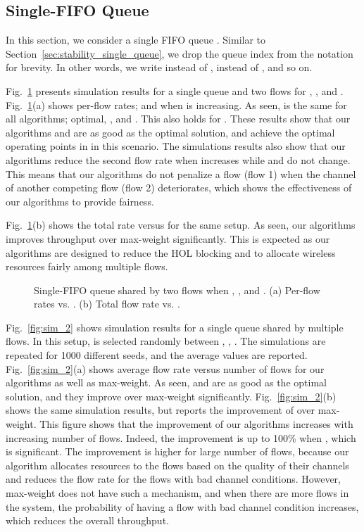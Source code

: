 \documentclass[conference]{IEEEtran}
\begin{document}
\subsection{Single-FIFO Queue}
In this section, we consider  a single FIFO queue . Similar to Section~{\ref{sec:stability_single_queue}}, we drop the queue index  from the notation for brevity. In other words, we write  instead of ,  instead of , and so on. 

Fig.~\ref{fig:sim_1} presents simulation results for a single queue and two flows for , , and . Fig.~\ref{fig:sim_1}(a) shows per-flow rates;  and  when  is increasing. As seen,  is the same for all algorithms; optimal, , and . This also holds for . These results show that our algorithms  and  are as good as the optimal solution, and achieve the optimal operating points in  in this scenario. The simulations results also show that our algorithms reduce the second flow rate  when  increases while  and  do not change. This means that our algorithms do not penalize a flow (flow 1) when the channel of another competing flow (flow 2) deteriorates, which shows the effectiveness of our algorithms to provide fairness. 

Fig.~\ref{fig:sim_1}(b) shows the total rate  versus  for the same setup. As seen, our algorithms improves throughput over max-weight significantly. This is expected as our algorithms are designed to reduce the HOL blocking and to allocate wireless resources fairly among multiple flows. 
\begin{figure}
\centering
{} \hspace{-20pt}
\vspace{-10pt}
\caption{Single-FIFO queue shared by two flows when , , and . (a) Per-flow rates vs. . (b) Total flow rate vs. . }
\label{fig:sim_1}
\vspace{-5pt}
\end{figure}

Fig.~\ref{fig:sim_2} shows simulation results for a single queue shared by multiple flows. In this setup,  is selected randomly between , , . The simulations are repeated for 1000 different seeds, and the average values are reported.  Fig.~\ref{fig:sim_2}(a) shows average flow rate versus number of flows for our algorithms as well as max-weight. As seen,  and  are as good as the optimal solution, and they improve over max-weight significantly. Fig.~\ref{fig:sim_2}(b) shows the same simulation results, but reports the improvement of  over max-weight. This figure shows that the improvement of our algorithms increases with increasing number of flows. Indeed, the improvement is up to 100\% when , which is significant. The improvement is higher for large number of flows, because our algorithm allocates resources to the flows based on the quality of their channels and reduces the flow rate for the flows with bad channel conditions. However, max-weight does not have such a mechanism, and when there are more flows in the system, the probability of having a flow with bad channel condition increases, which reduces the overall throughput.
\end{document}
